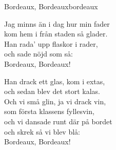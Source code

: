 \begin{song}{Bordeaux, Bordeaux}{bordeaux}
\begin{vers}
Jag minns än i dag hur min fader\\
kom hem i från staden så glader.\\
Han rada' upp flaskor i rader,\\
och sade nöjd som så:\\
Bordeaux, Bordeaux!\\
\end{vers}
\begin{vers}
Han drack ett glas, kom i extas,\\
och sedan blev det stort kalas.\\
Och vi små glin, ja vi drack vin,\\
som första klassens fyllesvin,\\
och vi dansade runt där på bordet\\
och skrek så vi blev blå:\\
Bordeaux, Bordeaux!\\
\end{vers}
\end{song}
